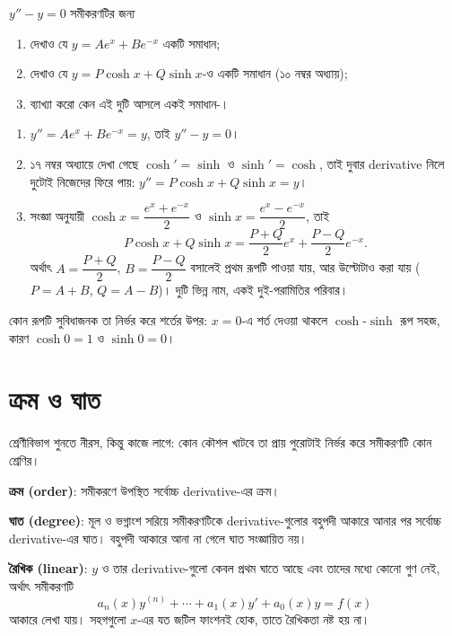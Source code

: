 \documentclass[11pt]{article}
\begin{document}
 $y'' - y = 0$ সমীকরণটির জন্য
\begin{enumerate}
  \item দেখাও যে $y = Ae^{x} + Be^{-x}$ একটি সমাধান;
  \item দেখাও যে $y = P\cosh x + Q\sinh x$-ও একটি সমাধান (১০ নম্বর
        অধ্যায়);
  \item ব্যাখ্যা করো কেন এই দুটি আসলে একই সমাধান-।
\end{enumerate}

\begin{sol}
\begin{enumerate}
  \item $y'' = Ae^{x} + Be^{-x} = y$, তাই $y'' - y = 0$।
  \item ১৭ নম্বর অধ্যায়ে দেখা গেছে $\cosh' = \sinh$ ও $\sinh' = \cosh$,
        তাই দুবার derivative নিলে দুটোই নিজেদের ফিরে পায়:
        $y'' = P\cosh x + Q\sinh x = y$।
  \item সংজ্ঞা অনুযায়ী $\cosh x = \dfrac{e^{x}+e^{-x}}{2}$ ও
        $\sinh x = \dfrac{e^{x}-e^{-x}}{2}$, তাই
        \[
          P\cosh x + Q\sinh x
          = \frac{P+Q}{2}e^{x} + \frac{P-Q}{2}e^{-x} .
        \]
        অর্থাৎ $A = \dfrac{P+Q}{2}$, $B = \dfrac{P-Q}{2}$ বসালেই প্রথম রূপটি
        পাওয়া যায়, আর উল্টোটাও করা যায় ($P = A+B$, $Q = A-B$)। দুটি ভিন্ন
        নাম, একই দুই-পরামিতির পরিবার।
\end{enumerate}
কোন রূপটি সুবিধাজনক তা নির্ভর করে শর্তের উপর: $x=0$-এ শর্ত দেওয়া থাকলে
$\cosh$-$\sinh$ রূপ সহজ, কারণ $\cosh 0 = 1$ ও $\sinh 0 = 0$।
\end{sol}

\section{ক্রম ও ঘাত}

শ্রেণীবিভাগ শুনতে নীরস, কিন্তু কাজে লাগে: কোন কৌশল খাটবে তা প্রায় পুরোটাই
নির্ভর করে সমীকরণটি কোন শ্রেণির।

\begin{idea}[ক্রম, ঘাত ও রৈখিকতা]
\textbf{ক্রম (order)}: সমীকরণে উপস্থিত সর্বোচ্চ derivative-এর ক্রম।

\textbf{ঘাত (degree)}: মূল ও ভগ্নাংশ সরিয়ে সমীকরণটিকে derivative-গুলোর
বহুপদী আকারে আনার পর সর্বোচ্চ derivative-এর ঘাত। বহুপদী আকারে আনা না গেলে
ঘাত সংজ্ঞায়িত নয়।

\textbf{রৈখিক (linear)}: $y$ ও তার derivative-গুলো কেবল প্রথম ঘাতে আছে এবং
তাদের মধ্যে কোনো গুণ নেই, অর্থাৎ সমীকরণটি
\[
  a_{n}(x)y^{(n)} + \cdots + a_{1}(x)y' + a_{0}(x)y = f(x)
\]
আকারে লেখা যায়। সহগগুলো $x$-এর যত জটিল ফাংশনই হোক, তাতে রৈখিকতা নষ্ট হয় না।
\end{idea}
\end{document}
